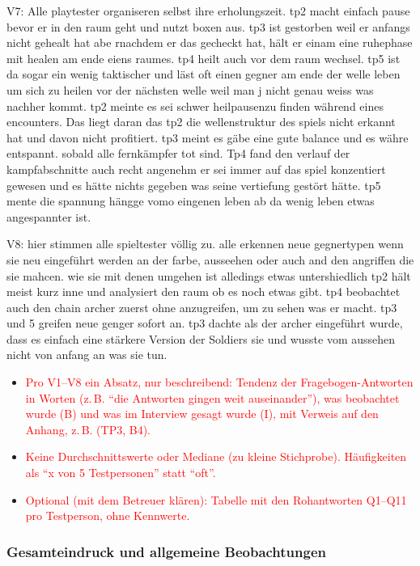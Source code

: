 \documentclass[../Main.tex]{subfiles}
\begin{document}
V7: Alle playtester organiseren selbst ihre erholungszeit. tp2 macht einfach pause bevor er in den raum geht und nutzt boxen aus. tp3 ist gestorben weil er anfangs nicht gehealt hat abe rnachdem er das gecheckt hat, hält er einam eine ruhephase mit healen am ende eiens raumes. tp4 heilt auch vor dem raum wechsel. tp5 ist da sogar ein wenig taktischer und läst oft einen gegner am ende der welle leben um sich zu heilen vor der nächsten welle weil man j nicht genau weiss was nachher kommt. tp2 meinte es sei schwer heilpausenzu finden während eines encounters. Das liegt daran das tp2 die wellenstruktur des spiels nicht erkannt hat und davon nicht profitiert. tp3 meint es gäbe eine gute balance und es währe entspannt. sobald alle fernkämpfer tot sind. Tp4 fand den verlauf der kampfabschnitte auch recht angenehm er sei immer auf das spiel konzentiert gewesen und es hätte nichts gegeben was seine vertiefung gestört hätte. tp5 mente die spannung hängge vomo eingenen leben ab da wenig leben etwas angespannter ist.

V8: hier stimmen alle spieltester völlig zu. alle erkennen neue gegnertypen wenn sie neu eingeführt werden an der farbe, ausseehen oder auch and den angriffen die sie mahcen. wie sie mit denen umgehen ist alledings etwas untershiedlich tp2 hält meist kurz inne und analysiert den raum ob es noch etwas gibt. tp4 beobachtet auch den chain archer zuerst ohne anzugreifen, um zu sehen was er macht. tp3 und 5 greifen neue genger sofort an. tp3 dachte als der archer eingeführt wurde, dass es einfach eine stärkere Version der Soldiers sie und wusste vom aussehen nicht von anfang an was sie tun.

\begin{itemize}[leftmargin=1.5cm]
    \item \textcolor{red}{Pro V1--V8 ein Absatz, nur beschreibend: Tendenz der Fragebogen-Antworten in Worten (z.\,B. \enquote{die Antworten gingen weit auseinander}), was beobachtet wurde (B) und was im Interview gesagt wurde (I), mit Verweis auf den Anhang, z.\,B. (TP3, B4).}
    \item \textcolor{red}{Keine Durchschnittswerte oder Mediane (zu kleine Stichprobe). Häufigkeiten als \enquote{x von 5 Testpersonen} statt \enquote{oft}.}
    \item \textcolor{red}{Optional (mit dem Betreuer klären): Tabelle mit den Rohantworten Q1--Q11 pro Testperson, ohne Kennwerte.}
\end{itemize}

\subsubsection{Gesamteindruck und allgemeine Beobachtungen} \label{sec:ErgAllgemein}
\end{document}
